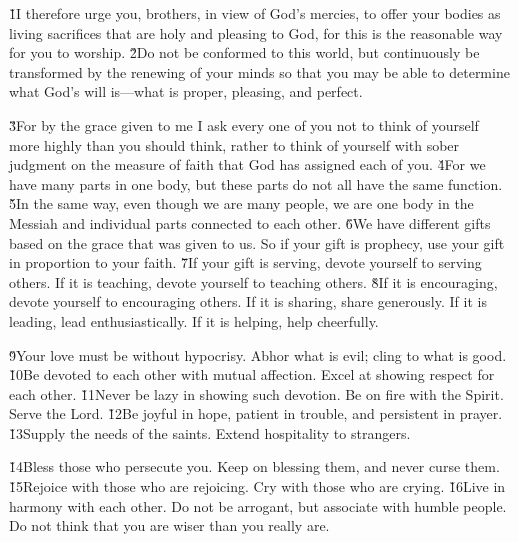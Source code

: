 \v{1}I therefore urge you, brothers, in view of God's mercies, to offer your bodies as living sacrifices that are holy and pleasing to God, for this is the reasonable way for you to worship. \v{2}Do not be conformed to this world, but continuously be transformed by the renewing of your minds so that you may be able to determine what God's will is---what is proper, pleasing, and perfect.

\v{3}For by the grace given to me I ask every one of you not to think of yourself more highly than you should think, rather to think of yourself with sober judgment on the measure of faith that God has assigned each of you. \v{4}For we have many parts in one body, but these parts do not all have the same function. \v{5}In the same way, even though we are many people, we are one body in the Messiah and individual parts connected to each other. \v{6}We have different gifts based on the grace that was given to us. So if your gift is prophecy, use your gift in proportion to your faith. \v{7}If your gift is serving, devote yourself to serving others. If it is teaching, devote yourself to teaching others. \v{8}If it is encouraging, devote yourself to encouraging others. If it is sharing, share generously. If it is leading, lead enthusiastically. If it is helping, help cheerfully.

\v{9}Your love must be without hypocrisy. Abhor what is evil; cling to what is good. \v{10}Be devoted to each other with mutual affection. Excel at showing respect for each other. \v{11}Never be lazy in showing such devotion. Be on fire with the Spirit. Serve the Lord. \v{12}Be joyful in hope, patient in trouble, and persistent in prayer. \v{13}Supply the needs of the saints. Extend hospitality to strangers.

\v{14}Bless those who persecute you. Keep on blessing them, and never curse them. \v{15}Rejoice with those who are rejoicing. Cry with those who are crying. \v{16}Live in harmony with each other. Do not be arrogant, but associate with humble people. Do not think that you are wiser than you really are.

